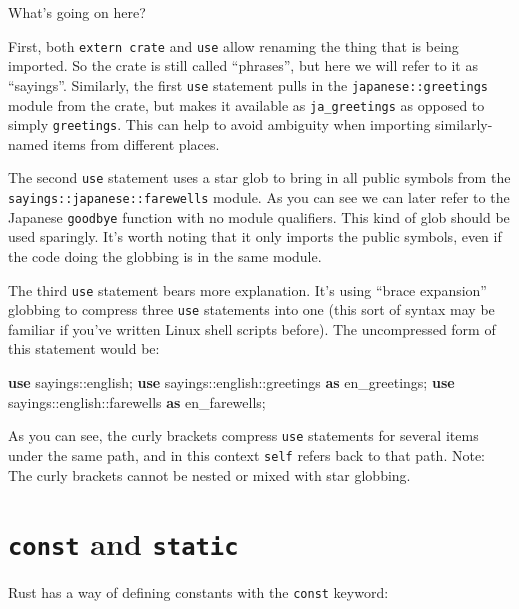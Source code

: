 \documentclass[a4paper,]{book}
\newenvironment{Shaded}{\begin{snugshade}}{\end{snugshade}}
\newcommand{\KeywordTok}[1]{\textcolor[rgb]{0.13,0.29,0.53}{\textbf{{#1}}}}
\newcommand{\NormalTok}[1]{{#1}}
\begin{document}
What's going on here?

First, both \texttt{extern\ crate} and \texttt{use} allow renaming the
thing that is being imported. So the crate is still called ``phrases'',
but here we will refer to it as ``sayings''. Similarly, the first
\texttt{use} statement pulls in the \texttt{japanese::greetings} module
from the crate, but makes it available as \texttt{ja\_greetings} as
opposed to simply \texttt{greetings}. This can help to avoid ambiguity
when importing similarly-named items from different places.

The second \texttt{use} statement uses a star glob to bring in all
public symbols from the \texttt{sayings::japanese::farewells} module. As
you can see we can later refer to the Japanese \texttt{goodbye} function
with no module qualifiers. This kind of glob should be used sparingly.
It's worth noting that it only imports the public symbols, even if the
code doing the globbing is in the same module.

The third \texttt{use} statement bears more explanation. It's using
``brace expansion'' globbing to compress three \texttt{use} statements
into one (this sort of syntax may be familiar if you've written Linux
shell scripts before). The uncompressed form of this statement would be:

\begin{Shaded}
\begin{Highlighting}[]
\KeywordTok{use} \NormalTok{sayings::english;}
\KeywordTok{use} \NormalTok{sayings::english::greetings }\KeywordTok{as} \NormalTok{en_greetings;}
\KeywordTok{use} \NormalTok{sayings::english::farewells }\KeywordTok{as} \NormalTok{en_farewells;}
\end{Highlighting}
\end{Shaded}

As you can see, the curly brackets compress \texttt{use} statements for
several items under the same path, and in this context \texttt{self}
refers back to that path. Note: The curly brackets cannot be nested or
mixed with star globbing.

\hypertarget{sec--const-and-static}{\section{\texorpdfstring{\texttt{const}
and \texttt{static}}{const and static}}\label{sec--const-and-static}}

Rust has a way of defining constants with the \texttt{const} keyword:
\end{document}
